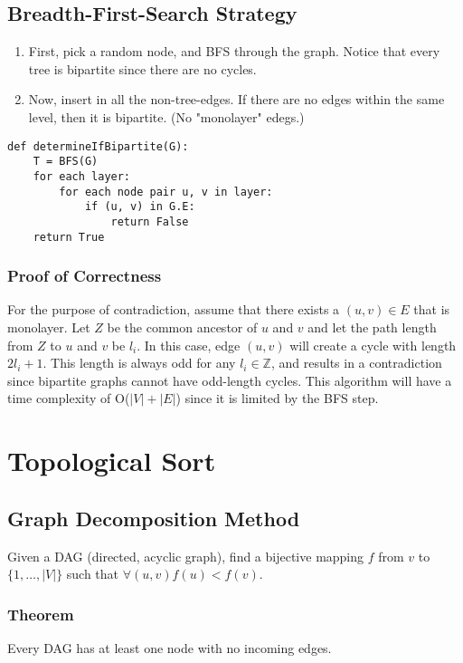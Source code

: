 \documentclass[10pt]{article}
\begin{document}
\subsection*{Breadth-First-Search Strategy}
\begin{enumerate}
	\item First, pick a random node, and BFS through the graph.  Notice that every tree is bipartite since there are no cycles.
	\item Now, insert in all the non-tree-edges.  If there are no edges within the same level, then it is bipartite.  (No "monolayer" edegs.)
\end{enumerate}
\begin{verbatim}
def determineIfBipartite(G):
    T = BFS(G)
    for each layer:
        for each node pair u, v in layer:
            if (u, v) in G.E:
                return False
    return True
\end{verbatim}
\subsubsection*{Proof of Correctness}
For the purpose of contradiction, assume that there exists a $(u, v) \in E$ that is monolayer.  Let $Z$ be the common ancestor of $u$ and $v$ and let the path length from $Z$ to $u$ and $v$ be $l_i$.  In this case, edge $(u, v)$ will create a cycle with length $2 l_i + 1$.  This length is always odd for any $l_i \in \mathbb{Z}$, and results in a contradiction since bipartite graphs cannot have odd-length cycles.  This algorithm will have a time complexity of O($|V| + |E|$) since it is limited by the BFS step.

\section*{Topological Sort}
\subsection*{Graph Decomposition Method}
Given a DAG (directed, acyclic graph), find a bijective mapping $f$ from $v$ to $\{1, \dots, |V|\}$ such that $\forall (u, v) f(u) < f(v)$.

\subsubsection*{Theorem}
Every DAG has at least one node with no incoming edges.
\end{document}
